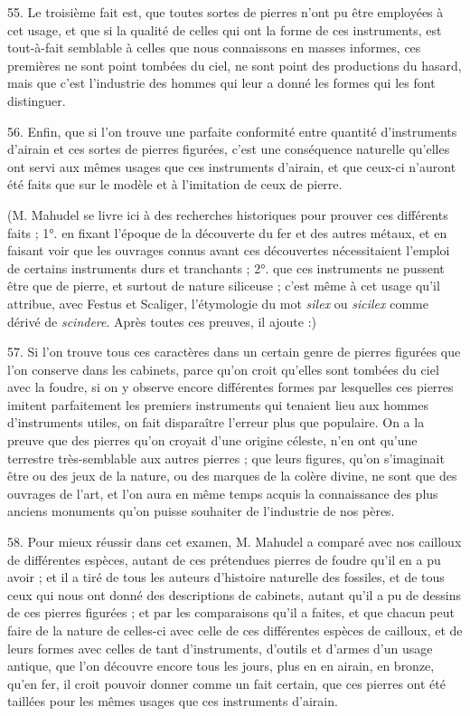 \documentclass[a4paper, 11pt, oneside, polutonikogreek, french]{article}
\begin{document}
55. Le troisième fait est, que toutes sortes de pierres n'ont pu être employées à cet usage, et que si la qualité de celles qui ont la forme de ces instruments, est tout-à-fait semblable à celles que nous connaissons en masses informes, ces premières ne sont point tombées du ciel, ne sont point des productions du hasard, mais que c'est l'industrie des hommes qui leur a donné les formes qui les font distinguer.

56. Enfin, que si l'on trouve une parfaite conformité entre quantité d'instruments d'airain et ces sortes de pierres figurées, c'est une conséquence naturelle qu'elles ont servi aux mêmes usages que ces instruments d'airain, et que ceux-ci n'auront été faits que sur le modèle et à l'imitation de ceux de pierre.

(M. Mahudel se livre ici à des recherches historiques pour prouver ces différents faits ; 1°. en fixant l'époque de la découverte du fer et des autres métaux, et en faisant voir que les ouvrages connus avant ces découvertes nécessitaient l'emploi de certains instruments durs et tranchants ; 2°. que ces instruments ne pussent être que de pierre, et surtout de nature siliceuse ; c'est même à cet usage qu'il attribue, avec Festus et Scaliger, l'étymologie du mot \emph{silex} ou \emph{sicilex} comme dérivé de \emph{scindere}. Après toutes ces preuves, il ajoute :)

57. \og Si l'on trouve tous ces caractères dans un certain genre de pierres figurées que l'on conserve dans les cabinets, parce qu'on croit qu'elles sont tombées du ciel avec la foudre, si on y observe encore différentes formes par lesquelles ces pierres imitent parfaitement les premiers instruments qui tenaient lieu aux hommes d'instruments utiles, on fait disparaître l'erreur plus que populaire. On a la preuve que des pierres qu'on croyait d'une origine céleste, n'en ont qu'une terrestre très-semblable aux autres pierres ; que leurs figures, qu'on s'imaginait être ou des jeux de la nature, ou des marques de la colère divine, ne sont que des ouvrages de l'art, et l'on aura en même temps acquis la connaissance des plus anciens monuments qu'on puisse souhaiter de l'industrie de nos pères. \fg

58. Pour mieux réussir dans cet examen, M. Mahudel a comparé avec nos cailloux de différentes espèces, autant de ces prétendues pierres de foudre qu'il en a pu avoir ; et il a tiré de tous les auteurs d'histoire naturelle des fossiles, et de tous ceux qui nous ont donné des descriptions de cabinets, autant qu'il a pu de dessins de ces pierres figurées ; et par les comparaisons qu'il a faites, et que chacun peut faire de la nature de celles-ci avec celle de ces différentes espèces de cailloux, et de leurs formes avec celles de tant d'instruments, d'outils et d'armes d'un usage antique, que l'on découvre encore tous les jours, plus en en airain, en bronze, qu'en fer, il croit pouvoir donner comme un fait certain, que ces pierres ont été taillées pour les mêmes usages que ces instruments d'airain.
\end{document}
